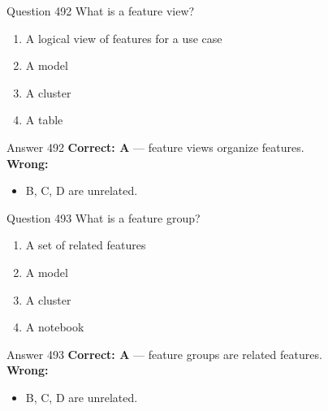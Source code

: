 \documentclass[aspectratio=169,11pt]{beamer}
\begin{document}
	\begin{frame}{Question 492}
		What is a feature view?
		\begin{enumerate}[label=\Alph*.]
			\item A logical view of features for a use case
			\item A model
			\item A cluster
			\item A table
		\end{enumerate}
	\end{frame}
	\begin{frame}{Answer 492}
		\textbf{Correct: A} --- feature views organize features.\\
		\vspace{0.5em}
		\textbf{Wrong:}
		\begin{itemize}
			\item B, C, D are unrelated.
		\end{itemize}
	\end{frame}
	
	\begin{frame}{Question 493}
		What is a feature group?
		\begin{enumerate}[label=\Alph*.]
			\item A set of related features
			\item A model
			\item A cluster
			\item A notebook
		\end{enumerate}
	\end{frame}
	\begin{frame}{Answer 493}
		\textbf{Correct: A} --- feature groups are related features.\\
		\vspace{0.5em}
		\textbf{Wrong:}
		\begin{itemize}
			\item B, C, D are unrelated.
		\end{itemize}
	\end{frame}
	
\end{document}
